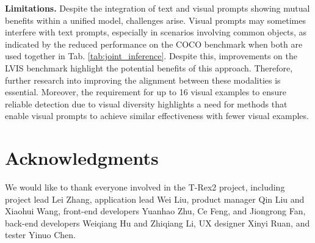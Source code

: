 \textbf{Limitations. }Despite the integration of text and visual prompts showing mutual benefits within a unified model, challenges arise. Visual prompts may sometimes interfere with text prompts, especially in scenarios involving common objects, as indicated by the reduced performance on the COCO benchmark when both are used together in Tab. \ref{tab:joint_inference}. Despite this, improvements on the LVIS benchmark highlight the potential benefits of this approach. Therefore, further research into improving the alignment between these modalities is essential. Moreover, the requirement for up to 16 visual examples to ensure reliable detection due to visual diversity highlights a need for methods that enable visual prompts to achieve similar effectiveness with fewer visual examples.

\section*{Acknowledgments}
We would like to thank everyone involved in the T-Rex2 project, including project lead Lei Zhang, application lead Wei Liu, product manager Qin Liu and Xiaohui Wang, front-end developers Yuanhao Zhu, Ce Feng, and Jiongrong Fan, back-end developers Weiqiang Hu and Zhiqiang Li, UX designer Xinyi Ruan, and tester Yinuo Chen.
